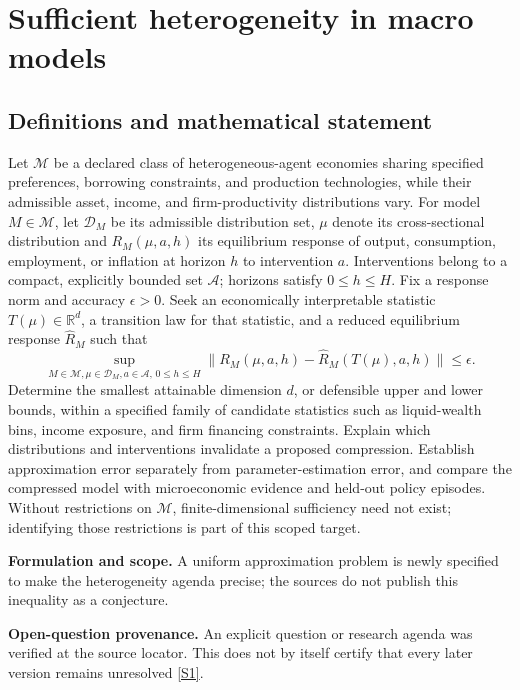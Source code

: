 \documentclass[11pt]{article}
\newcommand{\sref}[2]{\hyperlink{source:#1:#2}{[S#2]}}
\begin{document}
\section*{Sufficient heterogeneity in macro models}\label{30007515}
\subsection{Definitions and mathematical statement}
Let \(\mathcal M\) be a declared class of heterogeneous-agent economies sharing specified preferences, borrowing constraints, and production technologies, while their admissible asset, income, and firm-productivity distributions vary. For model \(M\in\mathcal M\), let \(\mathcal D_M\) be its admissible distribution set, \(\mu\) denote its cross-sectional distribution and \(R_M(\mu,a,h)\) its equilibrium response of output, consumption, employment, or inflation at horizon \(h\) to intervention \(a\). Interventions belong to a compact, explicitly bounded set \(\mathcal A\); horizons satisfy \(0\le h\le H\). Fix a response norm and accuracy \(\epsilon>0\).
Seek an economically interpretable statistic \(T(\mu)\in\mathbb R^d\), a transition law for that statistic, and a reduced equilibrium response \(\widehat R_M\) such that
\[
\sup_{M\in\mathcal M,\mu\in\mathcal D_M,a\in\mathcal A,\,0\le h\le H}
\|R_M(\mu,a,h)-\widehat R_M(T(\mu),a,h)\|\le\epsilon.
\]
Determine the smallest attainable dimension \(d\), or defensible upper and lower bounds, within a specified family of candidate statistics such as liquid-wealth bins, income exposure, and firm financing constraints. Explain which distributions and interventions invalidate a proposed compression. Establish approximation error separately from parameter-estimation error, and compare the compressed model with microeconomic evidence and held-out policy episodes. Without restrictions on \(\mathcal M\), finite-dimensional sufficiency need not exist; identifying those restrictions is part of this scoped target.

\par\textbf{Formulation and scope.} A uniform approximation problem is newly specified to make the heterogeneity agenda precise; the sources do not publish this inequality as a conjecture.

\par\textbf{Open-question provenance.} An explicit question or research agenda was verified at the source locator. This does not by itself certify that every later version remains unresolved \sref{30007515}{1}.
\end{document}
